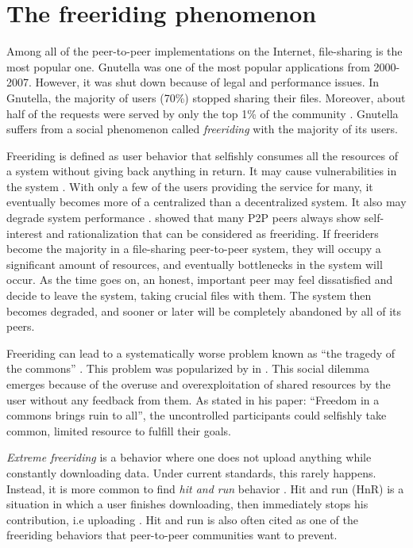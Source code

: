 \section{The freeriding phenomenon}
Among all of the peer-to-peer implementations on the Internet, file-sharing is the most popular one. Gnutella was one of the most popular applications from 2000-2007. However, it was shut down because of legal and performance issues. In Gnutella, the majority of users (70\%) stopped sharing their files. Moreover, about half of the requests were served by only the top 1\% of the community \cite{2000:freeridegnutella:adar}. Gnutella suffers from a social phenomenon called \textit{freeriding} with the majority of its users.

Freeriding is defined as user behavior that selfishly consumes all the resources of a system without giving back anything in return. It may cause vulnerabilities in the system \cite{2000:freeridegnutella:adar}. With only a few of the users providing the service for many, it eventually becomes more of a centralized than a decentralized system. It also may degrade system performance \cite{2000:freeridegnutella:adar}. \citeauthor{2000:freeridegnutella:adar} showed that many P2P peers always show self-interest and rationalization that can be considered as freeriding. If freeriders become the majority in a file-sharing peer-to-peer system, they will occupy a significant amount of resources, and eventually bottlenecks in the system will occur. As the time goes on, an honest, important peer may feel dissatisfied and decide to leave the system, taking crucial files with them. The system then becomes degraded, and sooner or later will be completely abandoned by all of its peers.

Freeriding can lead to a systematically worse problem known as ``the tragedy of the commons'' \cite{1968:tragedycommon:hardin}. This problem was popularized by \citet*{1968:tragedycommon:hardin} in \citeyear{1968:tragedycommon:hardin}. This social dilemma emerges because of the overuse and overexploitation of shared resources by the user without any feedback from them. As \citeauthor{1968:tragedycommon:hardin} stated in his paper: ``Freedom in a commons brings ruin to all'', the uncontrolled participants could selfishly take common, limited resource to fulfill their goals.

\textit{Extreme freeriding} is a behavior where one does not upload anything while constantly downloading data. Under current standards, this rarely happens. Instead, it is more common to find \textit{hit and run} behavior \cite{2011:managesupplydemand:meulpolder}. Hit and run (HnR) is a situation in which a user finishes downloading, then immediately stops his contribution, i.e uploading \cite{2014:sustainabilitytorrent:chen}. Hit and run is also often cited as one of the freeriding behaviors that peer-to-peer communities want to prevent. 

